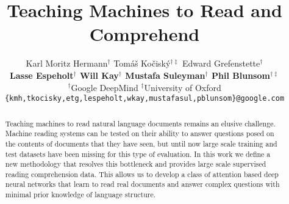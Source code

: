 \documentclass{article}
\title{Teaching Machines to Read and Comprehend}
\author{
  Karl Moritz Hermann$^\dag$ \quad Tom\'a\v{s} Ko\v{c}isk\'y$^{\dag\ddag}$ \quad Edward Grefenstette$^\dag$ \\
  {\bf Lasse Espeholt$^\dag$ \quad Will Kay$^\dag$ \quad Mustafa Suleyman$^\dag$
  \quad Phil Blunsom$^{\dag\ddag}$} \\
$^\dag$Google DeepMind \quad
$^\ddag$University of Oxford \\
\texttt{\{kmh,tkocisky,etg,lespeholt,wkay,mustafasul,pblunsom\}@google.com} \\
}
\begin{document}
\maketitle

\begin{abstract}
  Teaching machines to read natural language documents remains an elusive
  challenge. Machine reading systems can be tested on their ability to answer
  questions posed on the contents of documents that they have seen, but
  until now large scale training and test datasets have been missing for this
  type of evaluation.
  In this work we define a new methodology that resolves this bottleneck
  and provides large scale supervised reading comprehension data.
  This allows us to develop a class of attention based
  deep neural networks that learn to read real documents
  and answer complex questions with minimal prior knowledge of language
  structure.
\end{abstract}








\newpage



\newpage

\end{document}
